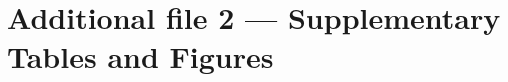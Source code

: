\documentclass{bmcart}
\begin{document}


\newpage

\section*{Additional file 2 --- Supplementary Tables and Figures}
\end{document}
